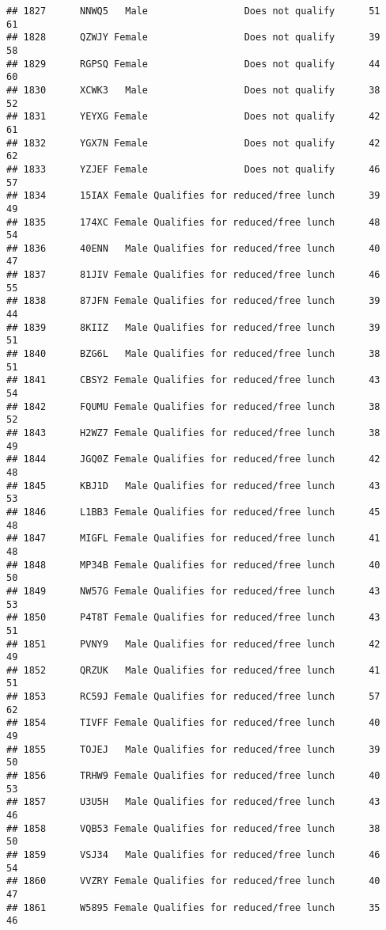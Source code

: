 \documentclass[
]{article}
\begin{document}
\begin{verbatim}
## 1827      NNWQ5   Male                 Does not qualify      51       61
## 1828      QZWJY Female                 Does not qualify      39       58
## 1829      RGPSQ Female                 Does not qualify      44       60
## 1830      XCWK3   Male                 Does not qualify      38       52
## 1831      YEYXG Female                 Does not qualify      42       61
## 1832      YGX7N Female                 Does not qualify      42       62
## 1833      YZJEF Female                 Does not qualify      46       57
## 1834      15IAX Female Qualifies for reduced/free lunch      39       49
## 1835      174XC Female Qualifies for reduced/free lunch      48       54
## 1836      40ENN   Male Qualifies for reduced/free lunch      40       47
## 1837      81JIV Female Qualifies for reduced/free lunch      46       55
## 1838      87JFN Female Qualifies for reduced/free lunch      39       44
## 1839      8KIIZ   Male Qualifies for reduced/free lunch      39       51
## 1840      BZG6L   Male Qualifies for reduced/free lunch      38       51
## 1841      CBSY2 Female Qualifies for reduced/free lunch      43       54
## 1842      FQUMU Female Qualifies for reduced/free lunch      38       52
## 1843      H2WZ7 Female Qualifies for reduced/free lunch      38       49
## 1844      JGQ0Z Female Qualifies for reduced/free lunch      42       48
## 1845      KBJ1D   Male Qualifies for reduced/free lunch      43       53
## 1846      L1BB3 Female Qualifies for reduced/free lunch      45       48
## 1847      MIGFL Female Qualifies for reduced/free lunch      41       48
## 1848      MP34B Female Qualifies for reduced/free lunch      40       50
## 1849      NW57G Female Qualifies for reduced/free lunch      43       53
## 1850      P4T8T Female Qualifies for reduced/free lunch      43       51
## 1851      PVNY9   Male Qualifies for reduced/free lunch      42       49
## 1852      QRZUK   Male Qualifies for reduced/free lunch      41       51
## 1853      RC59J Female Qualifies for reduced/free lunch      57       62
## 1854      TIVFF Female Qualifies for reduced/free lunch      40       49
## 1855      TOJEJ   Male Qualifies for reduced/free lunch      39       50
## 1856      TRHW9 Female Qualifies for reduced/free lunch      40       53
## 1857      U3U5H   Male Qualifies for reduced/free lunch      43       46
## 1858      VQB53 Female Qualifies for reduced/free lunch      38       50
## 1859      VSJ34   Male Qualifies for reduced/free lunch      46       54
## 1860      VVZRY Female Qualifies for reduced/free lunch      40       47
## 1861      W5895 Female Qualifies for reduced/free lunch      35       46

\end{verbatim}
\end{document}
